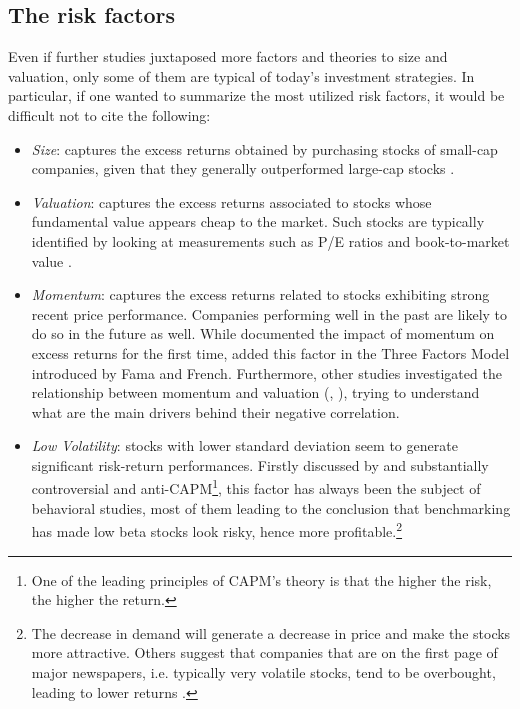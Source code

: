 \documentclass[12pt]{article}
\begin{document}
\subsection{The risk factors}
Even if further studies juxtaposed more factors and theories to size and valuation, only some of them are typical of today's investment strategies. In particular, if one wanted to summarize the most utilized risk factors, it would be difficult not to cite the following:
\begin{itemize}

\item \textit{Size}: captures the excess returns obtained by purchasing stocks of small-cap companies, given that they generally outperformed large-cap stocks \cite{fama1992cross}.

\item \textit{Valuation}: captures the excess returns associated to stocks whose fundamental value appears cheap to the market. Such stocks are typically identified by looking at measurements such as P/E ratios and book-to-market value \cite{fama1992cross}.

\item \textit{Momentum}: captures the excess returns related to stocks exhibiting strong recent price performance. Companies performing well in the past are likely to do so in the future as well. While  documented the impact of momentum on excess returns for the first time,  added this factor in the Three Factors Model introduced by Fama and French. Furthermore, other studies investigated the relationship between momentum and valuation (, ), trying to understand what are the main drivers behind their negative correlation.

\item \textit{Low Volatility}: stocks with lower standard deviation seem to generate significant risk-return performances. Firstly discussed by  and substantially controversial and anti-CAPM\footnote{One of the leading principles of CAPM's theory is that the higher the risk, the higher the return.}, this factor has always been the subject of behavioral studies, most of them leading to the conclusion that benchmarking has made low beta stocks look risky, hence more profitable.\footnote{The decrease in demand will generate a decrease in price and make the stocks more attractive. Others suggest that companies that are on the first page of major newspapers, i.e. typically very volatile stocks, tend to be overbought, leading to lower returns \cite{low_vol}.}


\end{itemize}
\end{document}
